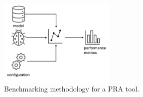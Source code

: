 \begin{figure}[h!]
    \centering
    \includegraphics[width=0.5\textwidth]{3_identifying_gaps/benchmarking/profiling_methods/figures/benchmarking_methodology.png}
    \caption{Benchmarking methodology for a PRA tool.}
    \label{fig:benchmarking_methodology}
\end{figure}
